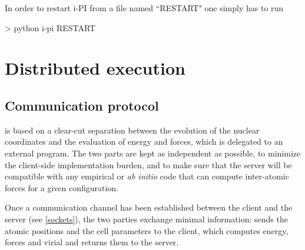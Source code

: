 \documentclass[11pt,english,fleqn]{report}
\newenvironment{code}{%
\footnotesize
\verbatim
}{
\endverbatim
\normalsize
}
\begin{document}
In order to restart i-PI from a file named ``RESTART" one simply has to run

\begin{code}
> python i-pi RESTART
\end{code}


\section{Distributed execution}

\label{distrib}

\subsection{Communication protocol}

\ipi is based on a clear-cut separation between the
evolution of the nuclear coordinates and the evaluation of energy
and forces, which is delegated to an external program.
The two parts are kept as independent as possible, to minimize
the client-side implementation burden, and to make sure that the
server will be compatible with any empirical or \emph{ab initio} code that
can compute inter-atomic forces for a given configuration.

Once a communication channel has been established between the
client and the server (see \ref{sockets}), the two parties
exchange minimal information: \ipi{} sends the atomic positions
and the cell parameters to the client, which computes energy, forces
and virial and returns them to the server.
\end{document}
